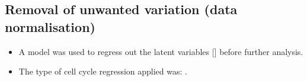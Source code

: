 \subsection{Removal of unwanted variation (data normalisation)}

\begin{itemize}
\item A \modelType{} model was used to regress out the latent variables [\latentVariables] before further analysis.
\item The type of cell cycle regression applied was: \cellCycle.
\end{itemize}